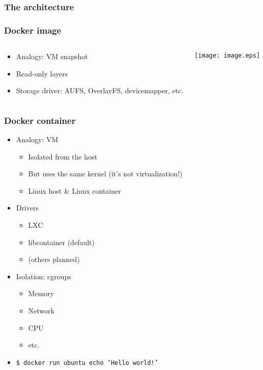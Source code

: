 \documentclass[xetex,mathserif,serif]{beamer}
\begin{document}
  \begin{frame}
    \frametitle{The architecture}
  \end{frame}
  \begin{frame}
    \frametitle{Docker image}
    \begin{columns}
      \begin{column}{0.5\textwidth}
        \begin{itemize}
          \item Analogy: VM snapshot
          \item Read-only layers
          \item Storage driver: AUFS, OverlayFS, devicemapper, etc.
        \end{itemize}
      \end{column}
      \begin{column}{0.5\textwidth}
        \texttt{[image: image.eps]}
      \end{column}
    \end{columns}
  \end{frame}
  \begin{frame}
    \frametitle{Docker container}
    \begin{itemize}
      \item Analogy: VM
        \begin{itemize}
          \item Isolated from the host
          \item But uses the same kernel (it's not virtualization!)
          \item Linux host \& Linux container
        \end{itemize}
      \item Drivers
        \begin{itemize}
          \item LXC
          \item libcontainer (default)
          \item (others planned)
        \end{itemize}
      \item Isolation: cgroups
      \begin{itemize}
        \item Memory
        \item Network
        \item CPU
        \item etc.
      \end{itemize}
    \item \texttt{\$ docker run ubuntu echo 'Hello world!'}
    \end{itemize}
  \end{frame}
\end{document}
